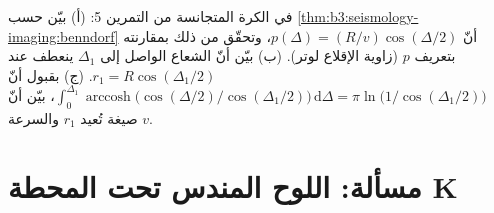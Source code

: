 \begin{exercise}[$\star\star\star$]\label{exo:b3:seismology-imaging:12}
في الكرة المتجانسة من التمرين 5: (أ) بيّن
حسب \cref{thm:b3:seismology-imaging:benndorf} أنّ $p(\Delta) = (R/v)\cos(\Delta/2)$،
وتحقّق من ذلك بمقارنته بتعريف $p$ (زاوية الإقلاع لوتر).
(ب) بيّن أنّ الشعاع الواصل إلى $\Delta_1$ ينعطف عند $r_1 = R\cos(\Delta_1/2)$.
(ج) بقبول أنّ $\int_0^{\Delta_1}\operatorname{arccosh}\bigl(\cos(\Delta/2)
/\cos(\Delta_1/2)\bigr)\,\mathrm d\Delta = \pi\ln\bigl(1/\cos(\Delta_1/2)\bigr)$،
بيّن أنّ صيغة  تُعيد $r_1$ والسرعة $v$.
\end{exercise}

\section{مسألة: اللوح المندس تحت المحطة K}

